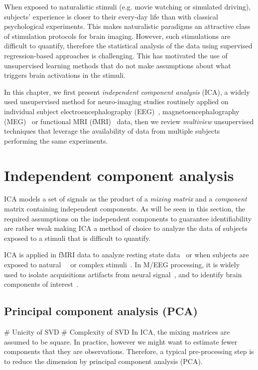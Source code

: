 When exposed to naturalistic stimuli (e.g. movie watching or simulated driving), subjects' experience is closer to their every-day life than with classical
psychological experiments.
% 
This makes naturalistic paradigms an attractive class of
stimulation protocols for brain imaging.
%
However, such stimulations are difficult to quantify, therefore the statistical analysis of the data using supervised regression-based approaches is challenging.
This has motivated the use of unsupervised learning methods that do not make
assumptions about what triggers brain activations in the stimuli.

In this chapter, we first present \emph{independent component analysis} (ICA), a widely used
unsupervised method for neuro-imaging studies routinely applied on individual
subject electroencephalography (EEG)~\cite{makeig1996independent},
magnetoencephalography (MEG)~\cite{vigario1998independent} or functional MRI
(fMRI)~\cite{mckeown1998independent} data, then we review \emph{multiview} unsupervised 
techniques that leverage the availability of data from multiple subjects
performing the same experiments. 

\section{Independent component analysis}
ICA models a set of signals as the product of a \emph{mixing matrix} and a
\emph{component} matrix containing independent components. As will be seen in this
section, the required assumptions on the independent components to guarantee
identifiability are rather weak making ICA a method of choice to analyze the
data of subjects exposed to a stimuli that is difficult to quantify.

ICA is applied in fMRI data to analyze resting state
data~\cite{beckmann2005investigations} or when subjects are
exposed to natural~\cite{malinen2007towards}~\cite{bartels2005brain} or complex stimuli~\cite{calhoun2002different}. 
In M/EEG processing, it is widely used to isolate acquisitions artifacts from neural signal~\cite{jung1998extended}, and to identify brain components of interest~\cite{vigario2000independent, delorme2012independent}.

\subsection{Principal component analysis (PCA)}
# Unicity of SVD
# Complexity of SVD
In ICA, the mixing matrices are assumed to be square. In practice, however we
might want to estimate fewer components that they are observations. Therefore, a
typical pre-processing step is to reduce the dimension by principal component
analysis (PCA). 



